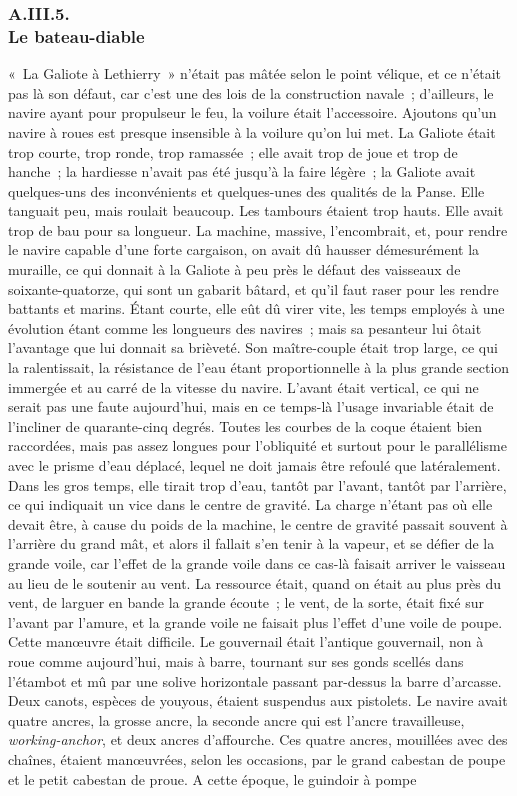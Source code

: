 \documentclass[french,twoside]{book} %
\begin{document}
 \subsubsection[{A.III.5. Le bateau-diable}]{A.III.5. \\
Le bateau-diable}
\noindent « La Galiote à Lethierry » n’était pas mâtée selon le point vélique, et ce n’était pas là son défaut, car c’est une des lois de la construction navale ; d’ailleurs, le navire ayant pour propulseur le feu, la voilure était l’accessoire. Ajoutons qu’un navire à roues est presque insensible à la voilure qu’on lui met. La Galiote était trop courte, trop ronde, trop ramassée ; elle avait trop de joue et trop de hanche ; la hardiesse n’avait pas été jusqu’à la faire légère ; la Galiote avait quelques-uns des inconvénients et quelques-unes des qualités de la Panse. Elle tanguait peu, mais roulait beaucoup. Les tambours étaient trop hauts. Elle avait trop de bau pour sa longueur. La machine, massive, l’encombrait, et, pour rendre le navire capable d’une forte cargaison, on avait dû hausser démesurément la muraille, ce qui donnait à la Galiote à peu près le défaut des vaisseaux de soixante-quatorze, qui sont un gabarit bâtard, et qu’il faut raser pour les rendre battants et  marins. Étant courte, elle eût dû virer vite, les temps employés à une évolution étant comme les longueurs des navires ; mais sa pesanteur lui ôtait l’avantage que lui donnait sa brièveté. Son maître-couple était trop large, ce qui la ralentissait, la résistance de l’eau étant proportionnelle à la plus grande section immergée et au carré de la vitesse du navire. L’avant était vertical, ce qui ne serait pas une faute aujourd’hui, mais en ce temps-là l’usage invariable était de l’incliner de quarante-cinq degrés. Toutes les courbes de la coque étaient bien raccordées, mais pas assez longues pour l’obliquité et surtout pour le parallélisme avec le prisme d’eau déplacé, lequel ne doit jamais être refoulé que latéralement. Dans les gros temps, elle tirait trop d’eau, tantôt par l’avant, tantôt par l’arrière, ce qui indiquait un vice dans le centre de gravité. La charge n’étant pas où elle devait être, à cause du poids de la machine, le centre de gravité passait souvent à l’arrière du grand mât, et alors il fallait s’en tenir à la vapeur, et se défier de la grande voile, car l’effet de la grande voile dans ce cas-là faisait arriver le vaisseau au lieu de le soutenir au vent. La ressource était, quand on était au plus près du vent, de larguer en bande la grande écoute ; le vent, de la sorte, était fixé sur l’avant par l’amure, et la grande voile ne faisait plus l’effet d’une voile de poupe. Cette manœuvre était difficile. Le gouvernail était l’antique gouvernail, non à roue comme aujourd’hui, mais à barre, tournant sur ses gonds scellés dans l’étambot et mû par une solive horizontale passant par-dessus la barre d’arcasse. Deux  canots, espèces de youyous, étaient suspendus aux pistolets. Le navire avait quatre ancres, la grosse ancre, la seconde ancre qui est l’ancre travailleuse, \emph{working-anchor}, et deux ancres d’affourche. Ces quatre ancres, mouillées avec des chaînes, étaient manœuvrées, selon les occasions, par le grand cabestan de poupe et le petit cabestan de proue. A cette époque, le guindoir à pompe 
\end{document}
